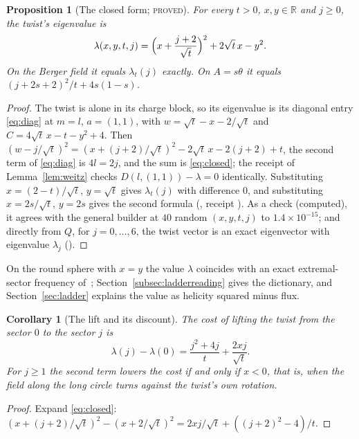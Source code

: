 \documentclass[11pt]{article}
\newtheorem{proposition}[theorem]{Proposition}
\newtheorem{corollary}[theorem]{Corollary}
\theoremstyle{definition}
\theoremstyle{remark}
\newcommand{\RR}{\mathbb{R}}
\newcommand{\PROVED}{\textsc{proved}}
\begin{document}
\begin{proposition}[The closed form; \PROVED]\label{prop:closed}
For every $t>0$, $x,y\in\RR$ and $j\ge0$, the twist's eigenvalue is
\begin{equation}\label{eq:closed}
  \lambda(x,y,t,j)=\Bigl(x+\frac{j+2}{\sqrt t}\Bigr)^2+2\sqrt t\,x-y^2 .
\end{equation}
On the Berger field it equals $\lambda_t(j)$ exactly. On $A=s\theta$ it equals $(j+2s+2)^2/t+4s(1-s)$.
\end{proposition}
\begin{proof}
The twist is alone in its charge block, so its eigenvalue is its diagonal entry \eqref{eq:diag} at $m=l$, $a=(1,1)$,
with $w=\sqrt t-x-2/\sqrt t$ and $C=4\sqrt t\,x-t-y^2+4$. Then $(w-j/\sqrt t)^2=(x+(j+2)/\sqrt t)^2-2\sqrt t\,x-2(j+2)+t$,
the second term of \eqref{eq:diag} is $4l=2j$, and the sum is \eqref{eq:closed}; the receipt of Lemma~\ref{lem:weitz}
checks $D(l,(1,1))-\lambda=0$ identically. Substituting $x=(2-t)/\sqrt t$, $y=\sqrt t$ gives $\lambda_t(j)$ with
difference $0$, and substituting $x=2s/\sqrt t$, $y=2s$ gives the second formula
(, receipt
). As a check (computed), it agrees with the
general builder at $40$ random $(x,y,t,j)$ to $1.4\times10^{-15}$; and directly from $Q$, for $j=0,\dots,6$, the twist
vector is an exact eigenvector with eigenvalue $\lambda_j$ ().
\end{proof}

On the round sphere with $x=y$ the value $\lambda$ coincides with an exact extremal-sector frequency
of~\cite{klc2021}; Section~\ref{subsec:ladderreading} gives the dictionary, and Section~\ref{sec:ladder} explains the
value as helicity squared minus flux.

\begin{corollary}[The lift and its discount]\label{cor:lift}
The cost of lifting the twist from the sector $0$ to the sector $j$ is
\[
  \lambda(j)-\lambda(0)=\frac{j^2+4j}{t}+\frac{2xj}{\sqrt t}.
\]
For $j\ge1$ the second term lowers the cost if and only if $x<0$, that is, when the field along the long circle turns
against the twist's own rotation.
\end{corollary}
\begin{proof}
Expand \eqref{eq:closed}: $(x+(j+2)/\sqrt t)^2-(x+2/\sqrt t)^2=2xj/\sqrt t+((j+2)^2-4)/t$.
\end{proof}
\end{document}
